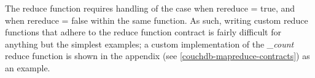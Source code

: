 The reduce function requires handling of the case when rereduce = true, and when rereduce = false within the same function. As such, writing custom reduce functions that adhere to the reduce function contract is fairly difficult for anything but the simplest examples; a custom implementation of the \textit{\_count} reduce function is shown in the appendix (see \ref{couchdb-mapreduce-contracts}) as an example.